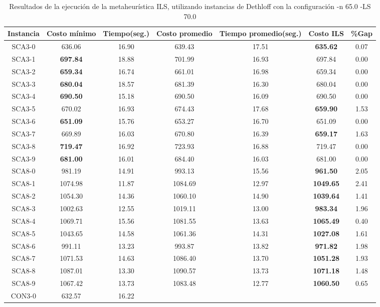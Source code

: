 \begin{table}[ht]
\caption{Resultados de la ejecución de la metaheurística ILS, utilizando instancias de Dethloff con la configuración -n 65.0 -LS 70.0}
\centering
\small
\begin{tabular}{c c c c c c c}
\hline\hline
Instancia & Costo mínimo & Tiempo(seg.) & Costo promedio & Tiempo promedio(seg.) & Costo ILS & \%Gap \\ [0.5ex]
\hline
SCA3-0 & 636.06 & 16.90 & 
639.43 & 17.51 & \bf{635.62} & 
0.07\\SCA3-1 & \bf{697.84} & 18.88 & 
701.99 & 16.93 & 697.84 & 0.00\\
SCA3-2 & \bf{659.34} & 16.74 & 
661.01 & 16.98 & 659.34 & 0.00\\
SCA3-3 & \bf{680.04} & 18.57 & 
681.39 & 16.30 & 680.04 & 0.00\\
SCA3-4 & \bf{690.50} & 15.18 & 
690.50 & 16.09 & 690.50 & 0.00\\
SCA3-5 & 670.02 & 16.93 & 
674.43 & 17.68 & \bf{659.90} & 
1.53\\SCA3-6 & \bf{651.09} & 15.76 & 
653.27 & 16.70 & 651.09 & 0.00\\
SCA3-7 & 669.89 & 16.03 & 
670.80 & 16.39 & \bf{659.17} & 
1.63\\SCA3-8 & \bf{719.47} & 16.92 & 
723.93 & 16.88 & 719.47 & 0.00\\
SCA3-9 & \bf{681.00} & 16.01 & 
684.40 & 16.03 & 681.00 & 0.00\\
SCA8-0 & 981.19 & 14.91 & 
993.13 & 15.56 & \bf{961.50} & 
2.05\\SCA8-1 & 1074.98 & 11.87 & 
1084.69 & 12.97 & \bf{1049.65} & 
2.41\\SCA8-2 & 1054.30 & 14.36 & 
1060.10 & 14.90 & \bf{1039.64} & 
1.41\\SCA8-3 & 1002.63 & 12.55 & 
1019.11 & 13.00 & \bf{983.34} & 
1.96\\SCA8-4 & 1069.71 & 15.56 & 
1081.55 & 13.63 & \bf{1065.49} & 
0.40\\SCA8-5 & 1043.65 & 14.58 & 
1061.36 & 14.31 & \bf{1027.08} & 
1.61\\SCA8-6 & 991.11 & 13.23 & 
993.87 & 13.82 & \bf{971.82} & 
1.98\\SCA8-7 & 1071.53 & 14.63 & 
1086.40 & 13.70 & \bf{1051.28} & 
1.93\\SCA8-8 & 1087.01 & 13.30 & 
1090.57 & 13.73 & \bf{1071.18} & 
1.48\\SCA8-9 & 1067.42 & 13.73 & 
1083.48 & 12.77 & \bf{1060.50} & 
0.65\\CON3-0 & 632.57 & 16.22 & 

\end{tabular}
\end{table}
